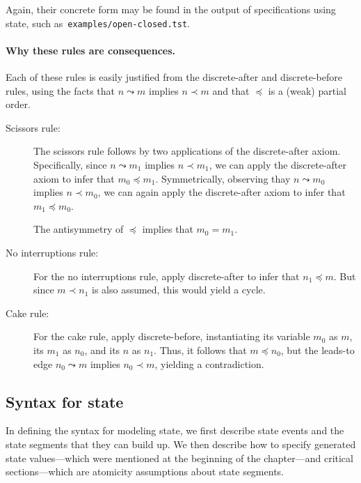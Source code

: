 Again, their concrete form may be found in the output of {\cpsa}
specifications using state, such as~\texttt{examples/open-closed.tst}.

\paragraph{Why these rules are consequences.}  Each of these rules is
easily justified from the discrete-after and discrete-before rules,
using the facts that $n\leadsto m$ implies $n\prec m$ and that
$\preceq$ is a (weak) partial order.

\begin{description}
  \item[Scissors rule:]  The scissors rule follows by two applications
  of the discrete-after axiom.  Specifically, since $n\leadsto m_1$
  implies $n\prec m_1$, we can apply the discrete-after axiom to infer
  that $m_0\preceq m_1$.  Symmetrically, observing thay
  $n\leadsto m_0$ implies $n\prec m_0$, we can again apply the
  discrete-after axiom to infer that $m_1\preceq m_0$.

  The antisymmetry of $\preceq$ implies that $m_0=m_1$.
  \item[No interruptions rule:]  For the no interruptions rule, apply
  discrete-after to infer that $n_1\preceq m$.  But since
  $m \prec n_1$ is also assumed, this would yield a cycle.
  \item[Cake rule:]  For the cake rule, apply discrete-before,
  instantiating its variable $m_0$ as $m$, its $m_1$ as $n_0$, and its
  $n$ as $n_1$.  Thus, it follows that $m\preceq n_0$, but the
  leads-to edge $n_0\leadsto m$ implies $n_0\prec m$, yielding a
  contradiction.
\end{description}

\subsection{Syntax for state}
\label{sec:channels:state:syntax}

In defining the syntax for modeling state, we first describe state
events and the state segments that they can build up.  We then
describe how to specify generated state values---which were mentioned
at the beginning of the chapter---and critical sections---which are
atomicity assumptions about state segments.

